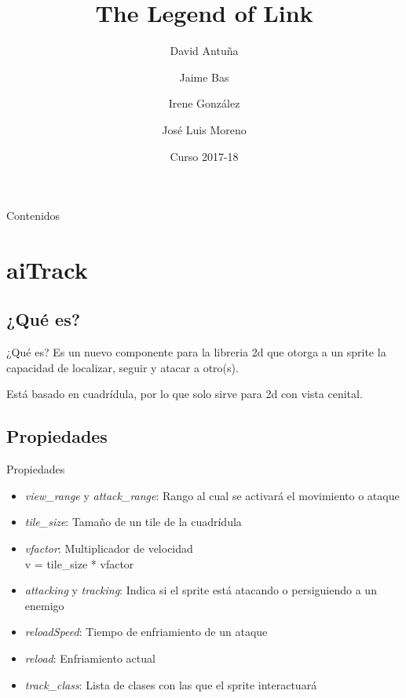 \documentclass{beamer}
\title{The Legend of Link}
\author{David Antuña \and Jaime Bas \and Irene González \and José Luis Moreno}
\institute[UCM]
{
  DVI\\
  Universidad Complutense de Madrid
}
\date{Curso 2017-18}
\begin{document}
\begin{frame}
  \titlepage
\end{frame}

\begin{frame}{Contenidos}
  \tableofcontents
\end{frame}

\section{aiTrack}

\subsection{¿Qué es?}

\begin{frame}{¿Qué es?}
Es un nuevo componente para la libreria 2d que otorga a un sprite la capacidad
de localizar, seguir y atacar a otro(s).

\medskip

Está basado en cuadrídula, por lo que solo sirve para 2d con vista cenital.
\end{frame}

\subsection{Propiedades}

\begin{frame}{Propiedades}
\begin{itemize}
  \item \textit{view\_range} y \textit{attack\_range}: Rango al cual se activará
    el movimiento o ataque
  \item \textit{tile\_size}: Tamaño de un tile de la cuadrídula
  \item \textit{vfactor}: Multiplicador de velocidad\\
    v = tile\_size * vfactor
  \item \textit{attacking} y \textit{tracking}: Indica si el sprite está
    atacando o persiguiendo a un enemigo
  \item \textit{reloadSpeed}: Tiempo de enfriamiento de un ataque
  \item \textit{reload}: Enfriamiento actual
  \item \textit{track\_class}: Lista de clases con las que el sprite interactuará
\end{itemize}
\end{frame}
\end{document}

